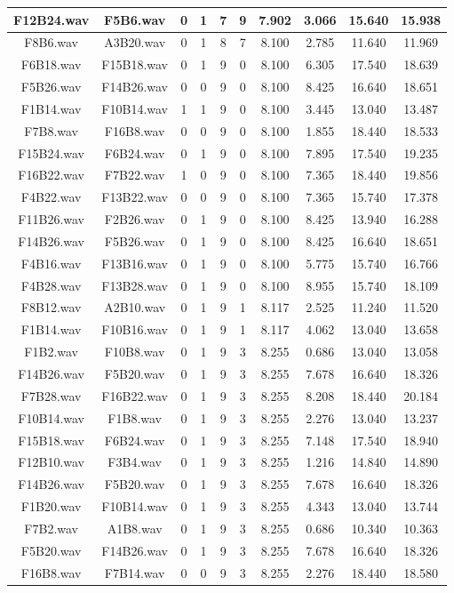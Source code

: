 \documentclass[11pt,a4paper,twoside]{book}
\begin{document}
\begin{longtable}[c]{|c|c|c|c|c|c|c|c|c|c|}
F12B24.wav&F5B6.wav&0&1&7&9&7.902&3.066&15.640&15.938\\ \hline
F8B6.wav&A3B20.wav&0&1&8&7&8.100&2.785&11.640&11.969\\ \hline
F6B18.wav&F15B18.wav&0&1&9&0&8.100&6.305&17.540&18.639\\ \hline
F5B26.wav&F14B26.wav&0&0&9&0&8.100&8.425&16.640&18.651\\ \hline
F1B14.wav&F10B14.wav&1&1&9&0&8.100&3.445&13.040&13.487\\ \hline
F7B8.wav&F16B8.wav&0&0&9&0&8.100&1.855&18.440&18.533\\ \hline
F15B24.wav&F6B24.wav&0&1&9&0&8.100&7.895&17.540&19.235\\ \hline
F16B22.wav&F7B22.wav&1&0&9&0&8.100&7.365&18.440&19.856\\ \hline
F4B22.wav&F13B22.wav&0&0&9&0&8.100&7.365&15.740&17.378\\ \hline
F11B26.wav&F2B26.wav&0&1&9&0&8.100&8.425&13.940&16.288\\ \hline
F14B26.wav&F5B26.wav&0&1&9&0&8.100&8.425&16.640&18.651\\ \hline
F4B16.wav&F13B16.wav&0&1&9&0&8.100&5.775&15.740&16.766\\ \hline
F4B28.wav&F13B28.wav&0&1&9&0&8.100&8.955&15.740&18.109\\ \hline
F8B12.wav&A2B10.wav&0&1&9&1&8.117&2.525&11.240&11.520\\ \hline
F1B14.wav&F10B16.wav&0&1&9&1&8.117&4.062&13.040&13.658\\ \hline
F1B2.wav&F10B8.wav&0&1&9&3&8.255&0.686&13.040&13.058\\ \hline
F14B26.wav&F5B20.wav&0&1&9&3&8.255&7.678&16.640&18.326\\ \hline
F7B28.wav&F16B22.wav&0&1&9&3&8.255&8.208&18.440&20.184\\ \hline
F10B14.wav&F1B8.wav&0&1&9&3&8.255&2.276&13.040&13.237\\ \hline
F15B18.wav&F6B24.wav&0&1&9&3&8.255&7.148&17.540&18.940\\ \hline
F12B10.wav&F3B4.wav&0&1&9&3&8.255&1.216&14.840&14.890\\ \hline
F14B26.wav&F5B20.wav&0&1&9&3&8.255&7.678&16.640&18.326\\ \hline
F1B20.wav&F10B14.wav&0&1&9&3&8.255&4.343&13.040&13.744\\ \hline
F7B2.wav&A1B8.wav&0&1&9&3&8.255&0.686&10.340&10.363\\ \hline
F5B20.wav&F14B26.wav&0&1&9&3&8.255&7.678&16.640&18.326\\ \hline
F16B8.wav&F7B14.wav&0&0&9&3&8.255&2.276&18.440&18.580\\ \hline

\end{longtable}
\end{document}

